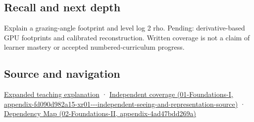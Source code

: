 \subsection{Recall and next depth}\label{appendix-b677a85ba76f-recall-and-next-depth}

Explain a grazing-angle footprint and level log 2 rho. Pending: derivative-based GPU footprints and calibrated reconstruction. Written coverage is not a claim of learner mastery or accepted numbered-curriculum progress.

\subsection{Source and navigation}\label{appendix-b677a85ba76f-source-and-navigation}

\hyperref[04-visual-computing-ii-ch042-multiresolution-work-must-preserve-the-right-information]{Expanded teaching explanation} · \href{../01-Foundations-I/main.pdf\#nameddest=appendix-fd090d982a15-xr01---independent-seeing-and-representation-source}{Independent coverage (01-Foundations-I, appendix-fd090d982a15-xr01-\/-\/-independent-seeing-and-representation-source)} · \href{../02-Foundations-II/main.pdf\#nameddest=appendix-4ad47bdd269a}{Dependency Map (02-Foundations-II, appendix-4ad47bdd269a)}
